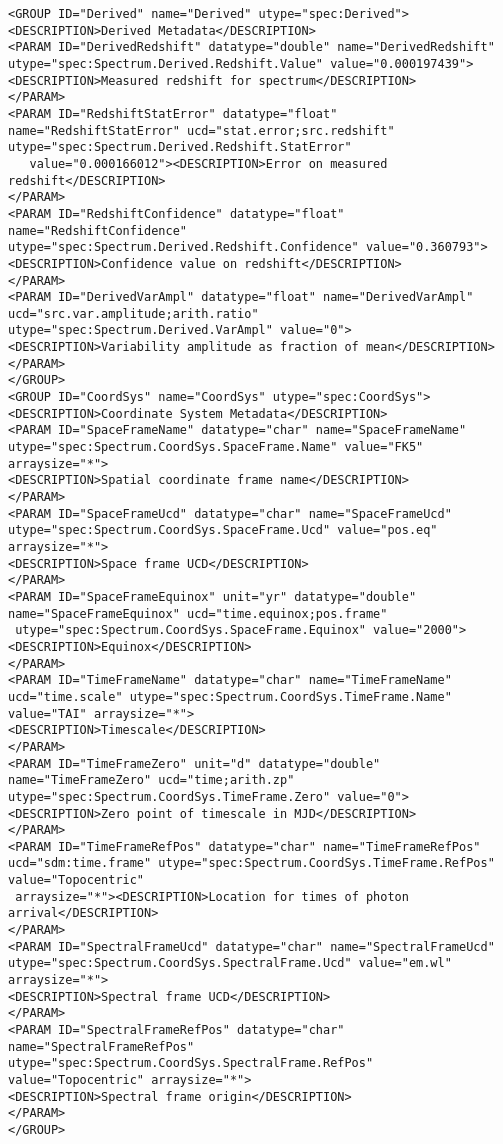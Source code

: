 \begin{landscape}
{\begin{flushleft}
\begin{fmlpage}
\begin{verbatim}
<GROUP ID="Derived" name="Derived" utype="spec:Derived">
<DESCRIPTION>Derived Metadata</DESCRIPTION>
<PARAM ID="DerivedRedshift" datatype="double" name="DerivedRedshift" utype="spec:Spectrum.Derived.Redshift.Value" value="0.000197439">
<DESCRIPTION>Measured redshift for spectrum</DESCRIPTION>
</PARAM>
<PARAM ID="RedshiftStatError" datatype="float" name="RedshiftStatError" ucd="stat.error;src.redshift" utype="spec:Spectrum.Derived.Redshift.StatError"
   value="0.000166012"><DESCRIPTION>Error on measured redshift</DESCRIPTION>
</PARAM>
<PARAM ID="RedshiftConfidence" datatype="float" name="RedshiftConfidence" utype="spec:Spectrum.Derived.Redshift.Confidence" value="0.360793">
<DESCRIPTION>Confidence value on redshift</DESCRIPTION>
</PARAM>
<PARAM ID="DerivedVarAmpl" datatype="float" name="DerivedVarAmpl" ucd="src.var.amplitude;arith.ratio" utype="spec:Spectrum.Derived.VarAmpl" value="0">
<DESCRIPTION>Variability amplitude as fraction of mean</DESCRIPTION>
</PARAM>
</GROUP>
<GROUP ID="CoordSys" name="CoordSys" utype="spec:CoordSys">
<DESCRIPTION>Coordinate System Metadata</DESCRIPTION>
<PARAM ID="SpaceFrameName" datatype="char" name="SpaceFrameName" utype="spec:Spectrum.CoordSys.SpaceFrame.Name" value="FK5" arraysize="*">
<DESCRIPTION>Spatial coordinate frame name</DESCRIPTION>
</PARAM>
<PARAM ID="SpaceFrameUcd" datatype="char" name="SpaceFrameUcd" utype="spec:Spectrum.CoordSys.SpaceFrame.Ucd" value="pos.eq" arraysize="*">
<DESCRIPTION>Space frame UCD</DESCRIPTION>
</PARAM>
<PARAM ID="SpaceFrameEquinox" unit="yr" datatype="double" name="SpaceFrameEquinox" ucd="time.equinox;pos.frame"
 utype="spec:Spectrum.CoordSys.SpaceFrame.Equinox" value="2000"><DESCRIPTION>Equinox</DESCRIPTION>
</PARAM>
<PARAM ID="TimeFrameName" datatype="char" name="TimeFrameName" ucd="time.scale" utype="spec:Spectrum.CoordSys.TimeFrame.Name" value="TAI" arraysize="*">
<DESCRIPTION>Timescale</DESCRIPTION>
</PARAM>
<PARAM ID="TimeFrameZero" unit="d" datatype="double" name="TimeFrameZero" ucd="time;arith.zp" utype="spec:Spectrum.CoordSys.TimeFrame.Zero" value="0">
<DESCRIPTION>Zero point of timescale in MJD</DESCRIPTION>
</PARAM>
<PARAM ID="TimeFrameRefPos" datatype="char" name="TimeFrameRefPos" ucd="sdm:time.frame" utype="spec:Spectrum.CoordSys.TimeFrame.RefPos" value="Topocentric" 
 arraysize="*"><DESCRIPTION>Location for times of photon arrival</DESCRIPTION>
</PARAM>
<PARAM ID="SpectralFrameUcd" datatype="char" name="SpectralFrameUcd" utype="spec:Spectrum.CoordSys.SpectralFrame.Ucd" value="em.wl" arraysize="*">
<DESCRIPTION>Spectral frame UCD</DESCRIPTION>
</PARAM>
<PARAM ID="SpectralFrameRefPos" datatype="char" name="SpectralFrameRefPos" utype="spec:Spectrum.CoordSys.SpectralFrame.RefPos" value="Topocentric" arraysize="*">
<DESCRIPTION>Spectral frame origin</DESCRIPTION>
</PARAM>
</GROUP>
\end{verbatim}
\end{fmlpage}


\end{flushleft}}
\end{landscape}
